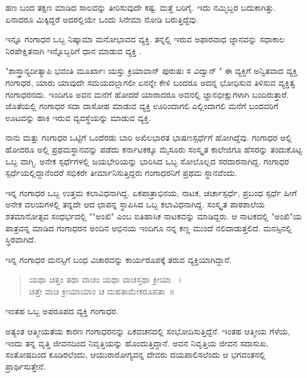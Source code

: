 {ಹಣ ಬಂದ ತಕ್ಷಣ ಮಾಡಿದ ಸಾಲವನ್ನು ತೀರಿಸುವುದೇ ಕಷ್ಟ. ಮತ್ತೆ ಬರಿಗೈ. ಇದು ನಮ್ಮಿಬ್ಬರ ಬದುಕಾಗಿತ್ತು. ಏನಾದರೂ ಮಿಕ್ಕಿದ್ದರೆ ಅದರಲ್ಲಿಯೇ ಒಂದು ಸಿನೇಮಾ ನೋಡಿ ಬರುತ್ತಿದ್ದೆವು. 

ಇನ್ನೂ ಗಂಗಾಧರ ಒಬ್ಬ ನಿಷ್ಕಾಮಾ ಮನೋಭಾವದ ವ್ಯಕ್ತಿ. ತನ್ನಲ್ಲಿ ಇರುವ ಅಫಾರವಾಧ ಜ್ಙಾನವನ್ನು ಸಧಾಕಾಲ ನಿರಪೇಕ್ಷಿತನಾಗಿ  ಇನ್ನೊಬ್ಬರಿಗೆ ಧಾನ ಮಾಡುವ ವ್ಯಕ್ತಿ .

"ಶಾಸ್ತ್ರಾನ್ಯದೀತ್ಯಾಪಿ ಭವಂತಿ ಮೂರ್ಖಾಃ ಯಸ್ತು ಕ್ರಿಯಾವಾನ್ ಪುರುಷಃ ಸ ವಿದ್ವಾನ್ " ಈ ವ್ಯಕ್ತಿಗೆ ಅನ್ವಿತವಾದ ವ್ಯಕ್ತಿ ಗಂಗಾಧರ, ಯಾರು ಯಾವುದೇ ಸಮಯದಲ್ಲಾಗಲೀ ಏನನ್ನೇ ಕೇಳಿ ಬಂದರೂ  ಅದನ್ನ ಭೋಧಿಸುವ ತಿಳಿಸುವ ವ್ಯಕ್ತಿತ್ವ ಗಂಗಾಧರನದು.  ಇಂದಿಗೂ ಅವನ ಮನೆಗೆ ಹೋದರೆ ಯಾರಾದರೂ  ಅವನಲ್ಲಿ ಜ್ಙಾನಭೀಕ್ಷುಗಳಾಗಿ ಬಂದಿರುತ್ತಾರೆ. ಜೊತೆಯಲ್ಲಿ ಗಂಗಾಧರ ಸದಾ ದಾಸೋಹ ಮಾಡುವ ವ್ಯಕ್ತಿ ಊರಿಂದಾಗಲಿ ಎಲ್ಲಿಂದಾಗಲಿ  ಮನೆಗೆ ಬಂದವರಿಗೆ ಊಟವನ್ನು ಹಾಕಿ ಇರುವ ವ್ಯವಸ್ಥೆಯನ್ನು  ಮಾಡುವ ವ್ಯಕ್ತಿ. 

ನಾನು ಮತ್ತು ಗಂಗಾಧರ ಒಟ್ಟಿಗೆ ಒಂದೆರಡು ಬಾರಿ ಅಖಿಲಭಾರತ ಭಾಷಣಸ್ಪರ್ಧೆಗೆ ಹೋಗಿದ್ದೆವು. ಗಂಗಾಧರ ಅಲ್ಲಿ ಹೋದರೂ ಅಲ್ಲಿ ಪ್ರಥಮಸ್ಥಾನವನ್ನು ಪಡೆದು ಕರ್ನಾಟಕಕ್ಕೂ ಮೈಸೂರು ಸಂಸ್ಕೃತ ಕಾಲೇಜಿಗೂ ಹೆಸರನ್ನು ತಂದುಕೊಟ್ಟ ಒಬ್ಬ ವಾಗ್ಮಿ. ಅನೇಕ ಸ್ಪರ್ಧೆಗಳಲ್ಲಿ ಜಯಭೇರಿಯನ್ನು ಭಾರಿಸಿದ ಒಬ್ಬ ಸೋಲೊಲ್ಲದ ಸರದಾರನಾಗಿದ್ದ. ಗಂಗಾಧರ ಸ್ಪರ್ಧೆಯಲ್ಲಿದ್ದಾನೆಂದರೆ ಸಭಿಕರೇ ತೀರ್ಮಾನಿಸುತ್ತಿದ್ದರು ಗಂಗಾಧರನಿಗೆ ಪ್ರಥಮ ಸ್ಥಾನವೆಂದು. 

ಇನ್ನ ಗಂಗಾಧರ  ಒಬ್ಬ ಉತ್ತಮ ಕಲಾವಿಧನಾಗಿದ್ದ. ಏಕಪಾತ್ರಾಭಿನಯ, ನಾಟಕ, ಚರ್ಚಾಸ್ಪರ್ಧೆ, ಪ್ರಬಂಧ ಸ್ಪರ್ಧೆ ಹೀಗೆ    ಅನೇಕ ವಲಯಗಳಲ್ಲಿ ತನ್ನದೇ ಆದ ಛಾಪನ್ನ ಸ್ಥಾಪಿಸಿದ ಒಬ್ಬ ಕಲಾವಿಧನಾಗಿದ್ದ. ಸಂಸ್ಕೃತ ಪಾಠಶಾಲೆಯ ಶತಮಾನೋತ್ಸವ ಸಂಧರ್ಭದಲ್ಲಿ ""ಅಂಖಿ" ಎಂಬ ಐತಿಹಾಸಿಕ ನಾಟಕವನ್ನು ಮಾಡಿದ್ದರು. ಆ ನಾಟಕದಲ್ಲಿ "ಅಂಖಿ"ಯ ಪಾತ್ರವನ್ನ ಮಾಡಿದ ಗಂಗಾಧರನ ಅಂದಿನ ಅಭಿನಯ ಇಂದಿಗೂ ನನ್ನ ಕಣ್ಣ ಮುಂದೆ ನಲಿದಾಡುತ್ತಲಿದೆ. ಮನಸ್ಸಿನಲ್ಲಿ ಸ್ಥಿರವಾಗಿದೆ.

ಇನ್ನ ಗಂಗಾಧರ ಮನಸ್ಸಿಗೆ ಬಂಧ ವಿಚಾರವನ್ನು ಕಾರ್ಯರೂಪಕ್ಕೆ ತರುವ ವ್ಯಕ್ತಿಯಾಗಿದ್ದಾನೆ.

\begin{verse}
ಯಥಾ ಚಿತ್ತಂ  ತಥಾ ವಾಚಂ ಯಥಾ ವಾಚಸ್ತಥಾ ಕ್ರೀಯಾ ~।\\
ಚಿತ್ತೇ ವಾಚಿ ಕ್ರೀಯಾಯಾಂ  ಚ ಮಹತಾಮೇಕರೂಪತಾ~॥
\end{verse}

ಇಂತಹ ಒಬ್ಬ ಅಪರೂಪದ ವ್ಯಕ್ತಿ ಗಂಗಾಧರ.        

ಅತ್ಯಂತ ಆತ್ಮೀಯತೆಯ ಕಾರಣ ಗಂಗಾಧರನನ್ನು  ಏಕವಚನದಲ್ಲಿ ಸಂಭೋದಿಸುತ್ತಿದ್ದೆನೆ. ಇಂತಹ ಆತ್ಮೀಯ ಗೆಳೆಯ, ಇಂದು ತನ್ನ ವೃತ್ತಿ ಜೀವನದಿಂದ ನಿವೃತ್ತಿಯನ್ನು ಹೊಂದುತ್ತಿದ್ದಾನೆ. ಅವನ ನಿವೃತ್ತಿಯ ಜೀವನ ಸದಾಸುಖ, ಸಂತೋಷದಿಂದ ಕೂಡಿರಲೆಂದು, ಆಯುರಾರೋಗ್ಯವನ್ನ ದೇವರು ದಯಪಾಲಿಸಲೆಂದು ಆ ಭಗವಂತನಲ್ಲಿ ಪ್ರಾರ್ಥಿಸುತ್ತೇನೆ. 

\articleend									
}
